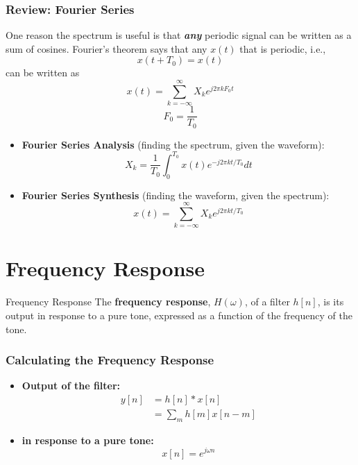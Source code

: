 \documentclass{beamer}
\begin{document}
\begin{frame}
  \frametitle{Review: Fourier Series}

  One reason the spectrum is useful is that {\bf\em any} periodic
  signal can be written as a sum of cosines.  Fourier's theorem says that
  any $x(t)$ that is periodic, i.e.,
  \[
  x(t+T_0) = x(t)
  \]
  can be written as
  \[
  x(t) = \sum_{k=-\infty}^\infty X_k e^{j2\pi k F_0 t}
  \]
  \[
  F_0 = \frac{1}{T_0}
  \]
\end{frame}

\begin{frame}
  \begin{itemize}
  \item {\bf Fourier Series Analysis}  (finding the spectrum, given the waveform):
    \[
    X_k = \frac{1}{T_0}\int_0^{T_0} x(t)e^{-j2\pi kt/T_0}dt
    \]
  \item {\bf Fourier Series Synthesis}  (finding the waveform, given the spectrum):
    \[
    x(t) = \sum_{k=-\infty}^\infty X_k e^{j2\pi kt/T_0}
    \]
  \end{itemize}
\end{frame}  

\section[Frequency Response]{Frequency Response}
\setcounter{subsection}{1}

\begin{frame}
  \begin{block}{Frequency Response}
    The {\bf frequency response}, $H(\omega)$, of a filter $h[n]$, is
    its output in response to a pure tone, expressed as a function of
    the frequency of the tone.
  \end{block}
\end{frame}

\begin{frame}
  \frametitle{Calculating the Frequency Response}
  \begin{itemize}
  \item {\bf Output of the filter:}
    \begin{align*}
      y[n] &= h[n]\ast x[n]\\
      &= \sum_m h[m] x[n-m]
    \end{align*}
  \item {\bf in response to a pure tone:}
    \[
    x[n] = e^{j\omega n}
    \]
  \end{itemize}
\end{frame}
\end{document}

